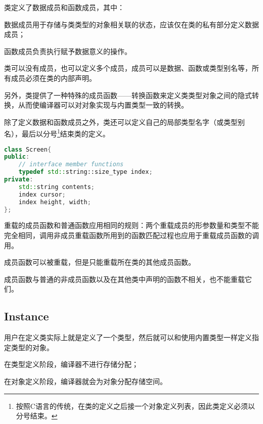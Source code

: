 类定义了数据成员和函数成员，其中：

\begin{compactitem}
\item 数据成员用于存储与类类型的对象相关联的状态，应该仅在类的私有部分定义数据成员；
\item 函数成员负责执行赋予数据意义的操作。
\end{compactitem}

类可以没有成员，也可以定义多个成员，成员可以是数据、函数或类型别名等，所有成员必须在类的内部声明。


另外，类提供了一种特殊的成员函数——转换函数来定义类类型对象之间的隐式转换，从而使编译器可以对对象实现与内置类型一致的转换。



除了定义数据和函数成员之外，类还可以定义自己的局部类型名字（或类型别名），最后以分号\footnote{按照C语言的传统，在类的定义之后接一个对象定义列表，因此类定义必须以分号结束。}结束类的定义。

\begin{lstlisting}[language=C++]
class Screen{
public:
	// interface member functions
	typedef std::string::size_type index;
private:
	std::string contents;
	index cursor;
	index height, width;
};
\end{lstlisting}

重载的成员函数和普通函数应用相同的规则：两个重载成员的形参数量和类型不能完全相同，调用非成员重载函数所用到的函数匹配过程也应用于重载成员函数的调用。

\begin{compactitem}
\item 成员函数可以被重载，但是只能重载所在类的其他成员函数。
\item 成员函数与普通的非成员函数以及在其他类中声明的函数不相关，也不能重载它们。
\end{compactitem}

\subsection{Instance}

用户在定义类实际上就是定义了一个类型，然后就可以和使用内置类型一样定义指定类型的对象。


\begin{compactitem}
\item 在类型定义阶段，编译器不进行存储分配；
\item 在对象定义阶段，编译器就会为对象分配存储空间。
\end{compactitem}



